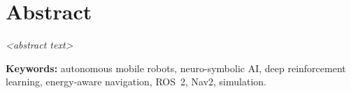 \chapter*{Abstract}


\textit{<abstract text>}

\vspace{1em}
\noindent\textbf{Keywords:} autonomous mobile robots, neuro-symbolic AI, deep reinforcement
learning, energy-aware navigation, ROS~2, Nav2, simulation.

